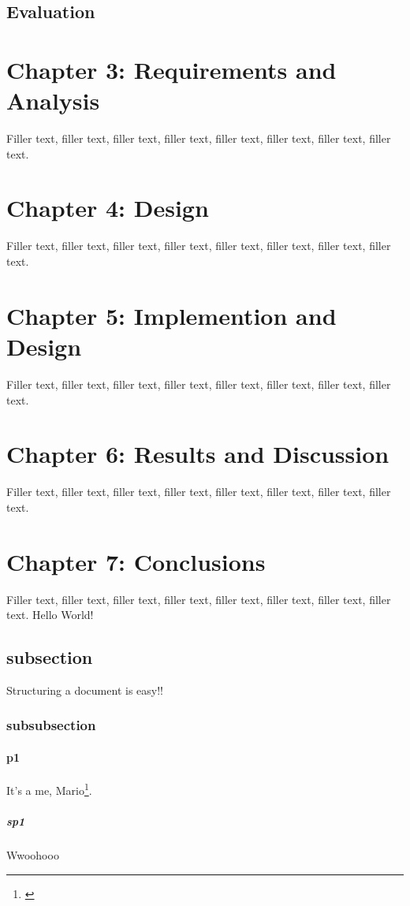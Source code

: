 \documentclass{article}
\begin{document}
\subsection{Evaluation}


\section{Chapter 3: Requirements and Analysis}
Filler text, filler text, filler text, filler text, filler text, filler text, filler text, filler text.
\section{Chapter 4: Design}
Filler text, filler text, filler text, filler text, filler text, filler text, filler text, filler text.
\section{Chapter 5: Implemention and Design}
Filler text, filler text, filler text, filler text, filler text, filler text, filler text, filler text.
\section{Chapter 6: Results and Discussion}
Filler text, filler text, filler text, filler text, filler text, filler text, filler text, filler text.
\section{Chapter 7: Conclusions}
Filler text, filler text, filler text, filler text, filler text, filler text, filler text, filler text.
Hello World!
\subsection{subsection}
Structuring a document is easy!! \cite{near2012rubicon}
\subsubsection{subsubsection}
\paragraph{p1}
It's a me, Mario\footnote{\label{myfootnote}\cite{near2012rubicon}}.
\subparagraph{sp1}
Wwoohooo
\end{document}
